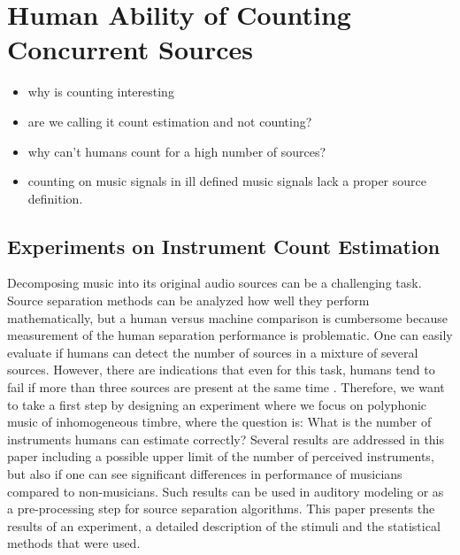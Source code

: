 \chapter{Human Ability of Counting Concurrent Sources}
\label{cha:countanalysis}



\begin{itemize}
  \item why is counting interesting
  \item are we calling it count estimation and not counting?
  \item why can't humans count for a high number of sources?
  \item counting on music signals in ill defined music signals lack a proper source definition.
\end{itemize}

\section{Experiments on Instrument Count Estimation}

Decomposing music into its original audio sources can be a challenging task. Source separation methods can be analyzed how well they perform mathematically, but a human versus machine comparison is cumbersome because measurement of the human separation performance is problematic. One can easily evaluate if humans can detect the number of sources in a mixture of several sources. However, there are indications that even for this task, humans tend to fail if more than three sources are present at the same time \cite{huron89}. Therefore, we want to take a first step by designing an experiment where we focus on polyphonic music of inhomogeneous timbre, where the question is: What is the number of instruments humans can estimate correctly? Several results are addressed in this paper including a possible upper limit of the number of perceived instruments, but also if one can see significant differences in performance of musicians compared to non-musicians. Such results can be used in auditory modeling or as a pre-processing step for source separation algorithms.
This paper presents the results of an experiment, a detailed description of the stimuli and the statistical methods that were used.

